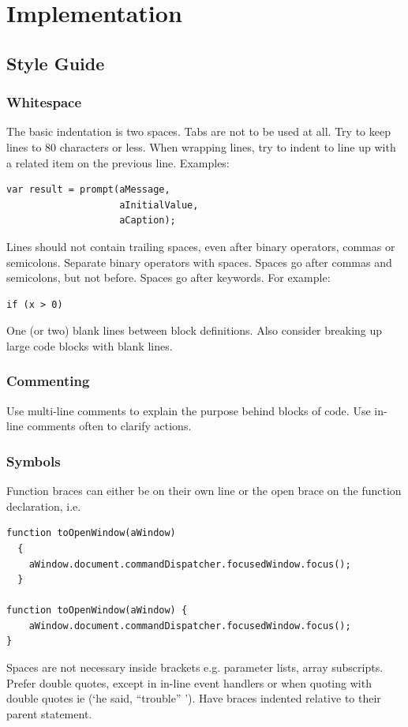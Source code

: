 \documentclass[letterpaper,12pt]{article}
\begin{document}
\section{Implementation}
\subsection{Style Guide}
\subsubsection{Whitespace}
The basic indentation is two spaces. Tabs are not to be used at all.
Try to keep lines to 80 characters or less. When wrapping lines, try to indent to line up with a related item on the previous line. Examples: 
\begin{verbatim}
var result = prompt(aMessage,
                    aInitialValue,
                    aCaption);
\end{verbatim}
Lines should not contain trailing spaces, even after binary operators, commas or semicolons.
Separate binary operators with spaces.
Spaces go after commas and semicolons, but not before.
Spaces go after keywords. For example:
\begin{verbatim}
if (x > 0)
\end{verbatim}
One (or two) blank lines between block definitions. Also consider breaking up large code blocks with blank lines.

\subsubsection{Commenting}
Use multi-line comments to explain the purpose behind blocks of code.
Use in-line comments often to clarify actions.

\subsubsection{Symbols}
Function braces can either be on their own line or the open brace on the function declaration, i.e.

\begin{verbatim}
function toOpenWindow(aWindow)
  {
    aWindow.document.commandDispatcher.focusedWindow.focus();  
  }

function toOpenWindow(aWindow) {
    aWindow.document.commandDispatcher.focusedWindow.focus();  
}
\end{verbatim}
Spaces are not necessary inside brackets e.g. parameter lists, array subscripts.
Prefer double quotes, except in in-line event handlers or when quoting with double quotes ie (‘he said, “trouble” ’).
Have braces indented relative to their parent statement.
\end{document}
